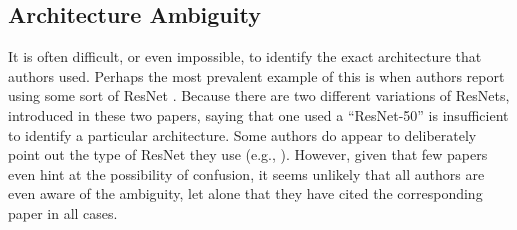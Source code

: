 
\subsection{Architecture Ambiguity}

It is often difficult, or even impossible, to identify the exact architecture that authors used. Perhaps the most prevalent example of this is when authors report using some sort of ResNet \cite{resnet, resnet2}. Because there are two different variations of ResNets, introduced in these two papers, saying that one used a ``ResNet-50'' is insufficient to identify a particular architecture. Some authors do appear to deliberately point out the type of ResNet they use (e.g., \cite{network-slimming, more-is-less}). However, given that few papers even hint at the possibility of confusion, it seems unlikely that all authors are even aware of the ambiguity, let alone that they have cited the corresponding paper in all cases. %


